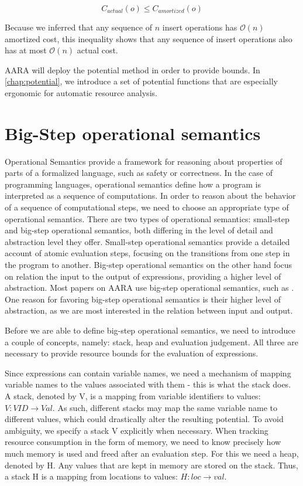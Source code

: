 \[C_{actual}(o) \leq C_{amortized}(o)\]
\label{ineq:actual-amortized}

Because we inferred that any sequence of \(n\) insert operations has \(\mathcal{O}(n)\) amortized cost, this inequality shows that any sequence of insert operations also has at most \(\mathcal{O}(n)\) actual cost.

AARA will deploy the potential method in order to provide bounds. In \ref{chap:potential}, we introduce a set of potential functions that are especially ergonomic for automatic resource analysis. 

\section{Big-Step operational semantics}
Operational Semantics provide a framework for reasoning about properties of parts of a formalized language, such as safety or correctness. In the case of programming languages, operational semantics define how a program is interpreted as a sequence of computations. In order to reason about the behavior of a sequence of computational steps, we need to choose an appropriate type of operational semantics.
There are two types of operational semantics: small-step and big-step operational semantics, both differing in the level of detail and abstraction level they offer. Small-step operational semantics provide a detailed account of atomic evaluation steps, focusing on the transitions from one step in the program to another. Big-step operational semantics on the other hand focus on relation the input to the output of expressions, providing a higher level of abstraction. Most papers on AARA use big-step operational semantics, such as . One reason for favoring big-step operational semantics is their higher level of abstraction, as we are most interested in the relation between input and output.

Before we are able to define big-step operational semantics, we need to introduce a couple of concepts, namely: stack, heap and evaluation judgement. All three are necessary to provide resource bounds for the evaluation of expressions.

Since expressions can contain variable names, we need a mechanism of mapping variable names to the values associated with them - this is what the stack does. A stack, denoted by V, is a mapping from variable identifiers to values: $V : VID \to Val$. As such, different stacks may map the same variable name to different values, which could drastically alter the resulting potential. To avoid ambiguity, we specify a stack V explicitly when necessary. 
When tracking resource consumption in the form of memory, we need to know precisely how much memory is used and freed after an evaluation step. For this we need a heap, denoted by H. Any values that are kept in memory are stored on the stack. Thus, a stack H is a mapping from locations to values: $H : loc \to val$. 

